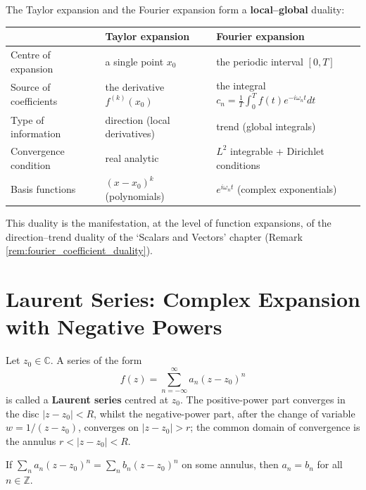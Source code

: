 \begin{remark}\label{rem:taylor_fourier_duality}
The Taylor expansion and the Fourier expansion form a \textbf{local--global} duality:
\begin{center}
\begin{tabular}{@{}>{\raggedright\arraybackslash}p{3.2cm}>{\raggedright\arraybackslash}p{4.2cm}>{\raggedright\arraybackslash}p{4.2cm}@{}}
\toprule
 & Taylor expansion & Fourier expansion \\
\midrule
Centre of expansion & a single point $x_0$ & the periodic interval $[0,T]$ \\
Source of coefficients & the derivative $f^{(k)}(x_0)$ & the integral $c_n = \frac{1}{T}\int_0^T f(t) e^{-i\omega_n t} dt$ \\
Type of information & direction (local derivatives) & trend (global integrals) \\
Convergence condition & real analytic & $L^2$ integrable + Dirichlet conditions \\
Basis functions & $(x-x_0)^k$ (polynomials) & $e^{i\omega_n t}$ (complex exponentials) \\
\bottomrule
\end{tabular}
\end{center}
This duality is the manifestation, at the level of function expansions, of the direction--trend duality of the `Scalars and Vectors' chapter (Remark \ref{rem:fourier_coefficient_duality}).
\end{remark}

\section{\texorpdfstring{Laurent Series: Complex Expansion with Negative Powers}{Laurent Series}}

\begin{definition}\label{def:laurent_series}
Let $z_0 \in \mathbb{C}$. A series of the form
\[
f(z) = \sum_{n=-\infty}^{\infty} a_n (z - z_0)^n
\]
is called a \textbf{Laurent series} centred at $z_0$. The positive-power part converges in the disc $|z-z_0| < R$, whilst the negative-power part, after the change of variable $w = 1/(z-z_0)$, converges on $|z-z_0| > r$; the common domain of convergence is the annulus $r < |z-z_0| < R$.
\end{definition}

\begin{lemma}\label{lem:laurent_uniqueness}
If $\sum_{n} a_n (z-z_0)^n = \sum_{n} b_n (z-z_0)^n$ on some annulus, then $a_n = b_n$ for all $n \in \mathbb{Z}$.
\end{lemma}

